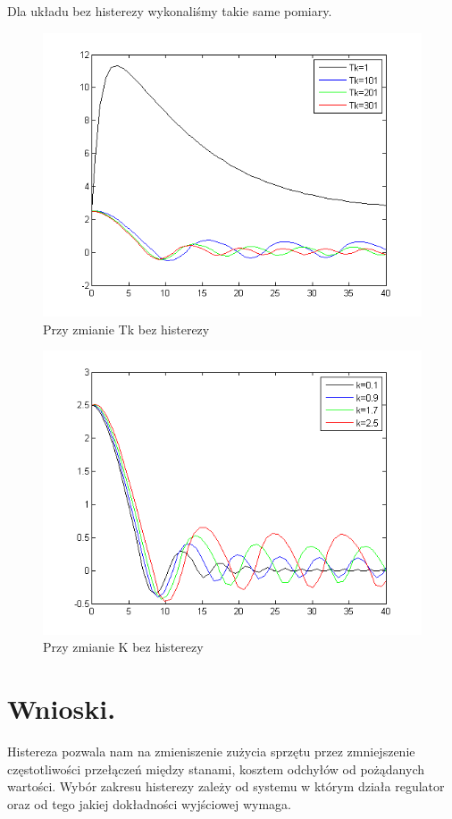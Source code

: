 \documentclass[a4paper,10pt]{article}
\begin{document}
\begin{enumerate}
\newpage
Dla układu bez histerezy wykonaliśmy takie same pomiary.
\begin{figure}[!h]
    \centering
	\includegraphics[width=120mm]{CW3-korekcja-trojpolozeniowyBH-e_Tk.png}
	\caption{Przy zmianie Tk bez histerezy}
    \label{fig:Rysunek}
\end{figure}

\begin{figure}[!h]
    \centering
	\includegraphics[width=120mm]{CW3-korekcja-trojpolozeniowyBH-e_k.png}
	\caption{Przy zmianie K bez histerezy}
    \label{fig:Rysunek}
\end{figure}

\end{enumerate}
\newpage
\newpage
\section{Wnioski.}\label{sec:wnioski}
Histereza pozwala nam na zmieniszenie zużycia sprzętu przez zmniejszenie częstotliwości przełączeń między stanami, kosztem odchyłów od pożądanych wartości. Wybór zakresu histerezy zależy od systemu w którym działa regulator oraz od tego jakiej dokładności wyjściowej wymaga.
\end{document}
